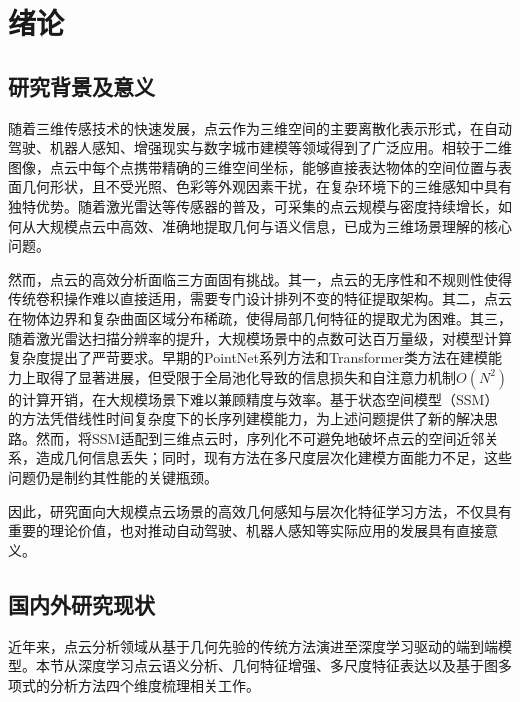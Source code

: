 \documentclass[12pt,a4paper,openany,oneside]{ctexbook}
\theoremstyle{definition}
\theoremstyle{remark}
\begin{document}
\tableofcontents
\clearpage

\chapter{绪论}
\label{chap:introduction}

\section{研究背景及意义}

随着三维传感技术的快速发展，点云作为三维空间的主要离散化表示形式，在自动驾驶、机器人感知、增强现实与数字城市建模等领域得到了广泛应用\cite{Vertex}。相较于二维图像，点云中每个点携带精确的三维空间坐标，能够直接表达物体的空间位置与表面几何形状，且不受光照、色彩等外观因素干扰，在复杂环境下的三维感知中具有独特优势。随着激光雷达等传感器的普及，可采集的点云规模与密度持续增长，如何从大规模点云中高效、准确地提取几何与语义信息，已成为三维场景理解的核心问题。

然而，点云的高效分析面临三方面固有挑战。其一，点云的无序性和不规则性使得传统卷积操作难以直接适用，需要专门设计排列不变的特征提取架构。其二，点云在物体边界和复杂曲面区域分布稀疏，使得局部几何特征的提取尤为困难。其三，随着激光雷达扫描分辨率的提升，大规模场景中的点数可达百万量级，对模型计算复杂度提出了严苛要求。早期的PointNet系列方法\cite{pointnet,PointNet++}和Transformer类方法\cite{pt,ptv3}在建模能力上取得了显著进展，但受限于全局池化导致的信息损失和自注意力机制$O(N^2)$的计算开销，在大规模场景下难以兼顾精度与效率。基于状态空间模型（SSM）的方法\cite{Mamba,PointMamba,pcm}凭借线性时间复杂度下的长序列建模能力，为上述问题提供了新的解决思路。然而，将SSM适配到三维点云时，序列化不可避免地破坏点云的空间近邻关系，造成几何信息丢失；同时，现有方法在多尺度层次化建模方面能力不足，这些问题仍是制约其性能的关键瓶颈。

因此，研究面向大规模点云场景的高效几何感知与层次化特征学习方法，不仅具有重要的理论价值，也对推动自动驾驶、机器人感知等实际应用的发展具有直接意义。

\section{国内外研究现状}

近年来，点云分析领域从基于几何先验的传统方法演进至深度学习驱动的端到端模型。本节从深度学习点云语义分析、几何特征增强、多尺度特征表达以及基于图多项式的分析方法四个维度梳理相关工作。
\end{document}
